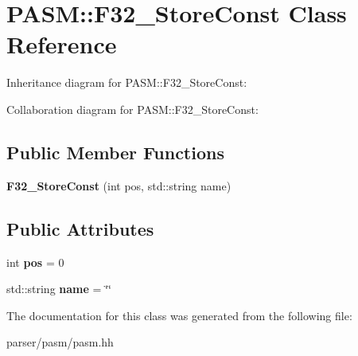 \hypertarget{classPASM_1_1F32__StoreConst}{}\section{P\+A\+SM\+:\+:F32\+\_\+\+Store\+Const Class Reference}
\label{classPASM_1_1F32__StoreConst}


Inheritance diagram for P\+A\+SM\+:\+:F32\+\_\+\+Store\+Const\+:


Collaboration diagram for P\+A\+SM\+:\+:F32\+\_\+\+Store\+Const\+:
\subsection*{Public Member Functions}
\begin{DoxyCompactItemize}
\item 
\mbox{\label{classPASM_1_1F32__StoreConst_a0615298be05974e16a45c7ed6f8906ce}} 
{\bfseries F32\+\_\+\+Store\+Const} (int pos, std\+::string name)
\end{DoxyCompactItemize}
\subsection*{Public Attributes}
\begin{DoxyCompactItemize}
\item 
\mbox{\label{classPASM_1_1F32__StoreConst_a812e43912195e60fe7467abf802ce545}} 
int {\bfseries pos} = 0
\item 
\mbox{\label{classPASM_1_1F32__StoreConst_ae67908934738af848fd6c870888b5515}} 
std\+::string {\bfseries name} = \char`\"{}\char`\"{}
\end{DoxyCompactItemize}


The documentation for this class was generated from the following file\+:\begin{DoxyCompactItemize}
\item 
parser/pasm/pasm.\+hh\end{DoxyCompactItemize}
